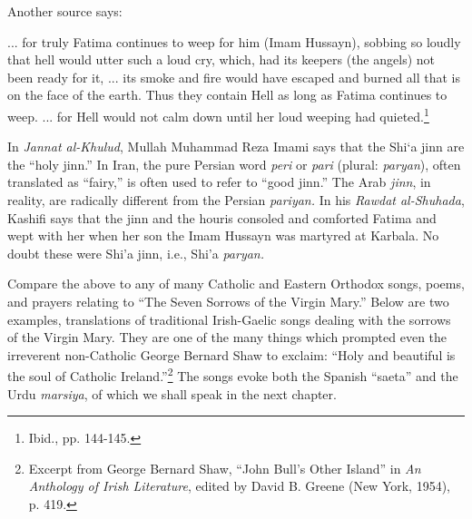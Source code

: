 Another source says:

\begin{quotex}
... for truly Fatima continues to weep for him (Imam Hussayn), sobbing so loudly that hell would utter such a loud cry, which, had its keepers (the angels) not been ready for it, ... its smoke and fire would have escaped and burned all that is on the face of the earth. Thus they contain Hell as long as Fatima continues to weep. ... for Hell would not calm down until her loud weeping had quieted.\footnote{Ibid., pp. 144-145.}
\end{quotex}


In \emph{Jannat al-Khulud}, Mullah Muhammad Reza Imami says that the Shi`a jinn are the ``holy jinn.'' In Iran, the pure Persian word \emph{peri} or \emph{pari} (plural: \emph{paryan}), often translated as ``fairy,'' is often used to refer to ``good jinn.'' The Arab \emph{jinn}, in reality, are radically different from the Persian \emph{pariyan.} In his \emph{Rawdat al-Shuhada}, Kashifi says that the jinn and the houris consoled and comforted Fatima and wept with her when her son the Imam Hussayn was martyred at Karbala. No doubt these were Shi'a jinn, i.e., Shi'a \emph{paryan.}

Compare the above to any of many Catholic and Eastern Orthodox songs, poems, and prayers relating to ``The Seven Sorrows of the Virgin Mary.'' Below are two examples, translations of traditional Irish-Gaelic songs dealing with the sorrows of the Virgin Mary. They are one of the many things which prompted even the irreverent non-Catholic George Bernard Shaw to exclaim: ``Holy and beautiful is the soul of Catholic Ireland.''\footnote{Excerpt from George Bernard Shaw, ``John Bull's Other Island'' in \emph{An Anthology of Irish Literature}, edited by David B. Greene (New York, 1954), p. 419.} The songs evoke both the Spanish ``saeta'' and the Urdu \emph{marsiya}, of which we shall speak in the next chapter.

